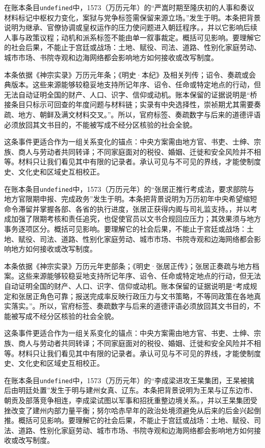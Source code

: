 在账本条目\texttt{undefined}中，1573（万历元年）的“严嵩时期至隆庆初的人事和奏议材料标记中枢权力变化，案狱与党争标签需保留来源立场。”发生于明。本条把背景说明为继承、官僚协调或皇权运作的压力使问题进入朝廷程序。，并以它影响后续人事与政策议程；动机和派系标签不能由单一叙事裁定。概括可见影响。要理解它的社会后果，不能止于宫廷或战场：土地、赋役、司法、道路、性别化家庭劳动、城市市场、书院寺观和边海网络都会影响地方如何接收或改写制度。

本条依据《神宗实录》万历元年条；《明史·本纪》及相关列传；诏令、奏疏或会典版本。这些来源能够较稳妥地支持所记年序、诏令、任命或特定地点的行动，但无法自动证明全国的财产、人口、识字、信仰或动机。账本保留的证据说明是“桥接条目只标示可回查的年度问题与材料链；实录有中央选择性，崇祯期尤其需要奏疏、地方、朝鲜及满文材料交叉。”。所以，官府标签、奏疏数字与后来的道德评语必须放回其文书目的，不能被写成不经分区核验的社会全貌。

这条事件更适合作为一组关系变化的锚点：中央方案需由地方官、书吏、士绅、宗族、商人与劳动者共同转译；不同家庭面对的税役、婚姻、迁徙和安全风险并不相等。材料只让我们看见其中有限的记录者。承认可见与不可见的界线，才能使制度史、文化史和区域史互相校正。

在账本条目\texttt{undefined}中，1573（万历元年）的“张居正推行考成法，要求部院与地方官限期申报、完成政务”发生于明。本条把背景说明为万历初年中央希望缩短命令滞留并掌握各部、各省的执行进度，张居正获得内阁与司礼监支持。，并以考成加强了限期考核和责任追究，也促使官员以文书合规回应压力；其效果须与地方事务逐项区分。概括可见影响。要理解它的社会后果，不能止于宫廷或战场：土地、赋役、司法、道路、性别化家庭劳动、城市市场、书院寺观和边海网络都会影响地方如何接收或改写制度。

本条依据《神宗实录》万历元年吏部条；《明史·张居正传》；张居正奏疏与地方档案。这些来源能够较稳妥地支持所记年序、诏令、任命或特定地点的行动，但无法自动证明全国的财产、人口、识字、信仰或动机。账本保留的证据说明是“考成规定和张居正角色可靠；报送完成率反映行政压力与文书策略，不等同政策在各地真实落实。”。所以，官府标签、奏疏数字与后来的道德评语必须放回其文书目的，不能被写成不经分区核验的社会全貌。

这条事件更适合作为一组关系变化的锚点：中央方案需由地方官、书吏、士绅、宗族、商人与劳动者共同转译；不同家庭面对的税役、婚姻、迁徙和安全风险并不相等。材料只让我们看见其中有限的记录者。承认可见与不可见的界线，才能使制度史、文化史和区域史互相校正。

在账本条目\texttt{undefined}中，1573（万历元年）的“李成梁进攻王杲集团，王杲被擒后由明廷处置”发生于明与建州女真、辽东。本条把背景说明为王杲与辽东边市、朝贡及部落竞争相连，李成梁试图以军事和招抚重整边境关系。，并以王杲集团受挫改变了建州内部力量平衡；努尔哈赤早年的政治处境须避免从后来的后金兴起倒推。概括可见影响。要理解它的社会后果，不能止于宫廷或战场：土地、赋役、司法、道路、性别化家庭劳动、城市市场、书院寺观和边海网络都会影响地方如何接收或改写制度。

